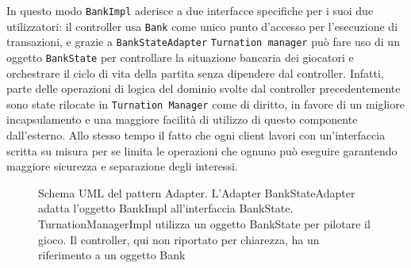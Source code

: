 In questo modo \texttt{BankImpl} aderisce a due interfacce
specifiche per i suoi due utilizzatori: il controller usa \texttt{Bank} come unico punto d'accesso per l'esecuzione di transazioni, e grazie a \texttt{BankStateAdapter} \texttt{Turnation manager} può fare uso di 
un oggetto \texttt{BankState} per controllare la situazione bancaria dei giocatori e orchestrare il ciclo di vita della partita senza dipendere dal controller.
Infatti, parte delle operazioni di logica del dominio svolte dal controller precedentemente sono state rilocate in \texttt{Turnation Manager} come di diritto, in favore di un migliore incapsulamento e una 
maggiore facilità di utilizzo di questo componente dall'esterno. 
Allo stesso tempo il fatto che ogni client lavori con un'interfaccia scritta su misura per se limita le operazioni che ognuno può eseguire garantendo maggiore sicurezza e separazione degli interessi.\newline
\begin{figure}[H]
    \centering
    \caption{Schema UML del pattern Adapter. L'Adapter BankStateAdapter adatta l'oggetto BankImpl all'interfaccia BankState. TurnationManagerImpl utilizza
    un oggetto BankState per pilotare il gioco. Il controller, qui non riportato per chiarezza, ha un riferimento a un oggetto Bank}
	\label{img:bankstate}
\end{figure}
